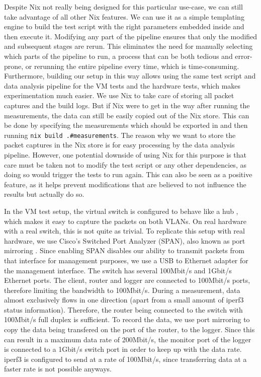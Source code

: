 Despite Nix not really being designed for this particular use-case, we can still take advantage of all other Nix features.
We can use it as a simple templating engine to build the test script with the right parameters embedded inside and then execute it.
Modifying any part of the pipeline ensures that only the modified and subsequent stages are rerun.
This eliminates the need for manually selecting which parts of the pipeline to run, a process that can be both tedious and error-prone, or rerunning the entire pipeline every time, which is time-consuming.
Furthermore, building our setup in this way allows using the same test script and data analysis pipeline for the VM tests and the hardware tests, which makes experimentation much easier.
We use Nix to take care of storing all packet captures and the build logs.
But if Nix were to get in the way after running the measurements, the data can still be easily copied out of the Nix store.
This can be done by specifying the measurements which should be exported in  and then running \texttt{nix build .#measurements}.
The reason why we want to store the packet captures in the Nix store is for easy processing by the data analysis pipeline.
However, one potential downside of using Nix for this purpose is that care must be taken not to modify the test script or any other dependencies, as doing so would trigger the tests to run again.
This can also be seen as a positive feature, as it helps prevent modifications that are believed to not influence the results but actually do so.

In the VM test setup, the virtual switch is configured \cite{NixOS-VM-test-Hub} to behave like a hub \cite[Clause 12.4]{9844436}, which makes it easy to capture the packets on both VLANs.
On real hardware with a real switch, this is not quite as trivial.
To replicate this setup with real hardware, we use Cisco's Switched Port Analyzer (SPAN), also known as port mirroring \cite{cisco-span-tutorial}.
Since enabling SPAN disables our ability to transmit packets from that interface for management purposes, we use a USB to Ethernet adapter for the management interface.
The switch has several 100Mbit/s and 1Gbit/s Ethernet ports.
The client, router and logger are connected to 100Mbit/s ports, therefore limiting the bandwidth to 100Mbit/s.
During a measurement, data almost exclusively flows in one direction (apart from a small amount of iperf3 status information).
Therefore, the router being connected to the switch with 100Mbit/s full duplex is sufficient.
To record the data, we use port mirroring to copy the data being transfered on the port of the router, to the logger.
Since this can result in a maximum data rate of 200Mbit/s, the monitor port of the logger is connected to a 1Gbit/s switch port in order to keep up with the data rate.
iperf3 is configured to send at a rate of 100Mbit/s, since transferring data at a faster rate is not possible anyways.

